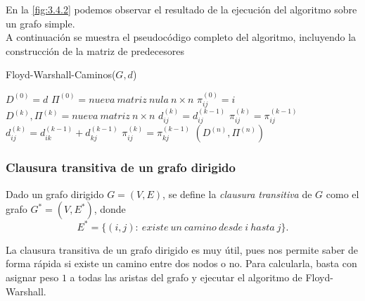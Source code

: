 En la \autoref{fig:3.4.2} podemos observar el resultado de la ejecución del algoritmo sobre un grafo simple. \\

A continuación se muestra el pseudocódigo completo del algoritmo, incluyendo la construcción de la matriz de predecesores

\begin{breakablealgorithm}
	\caption{Floyd-Warshall-Caminos($G,d$)}
	\begin{algorithmic}[1]
		\State $D^{(0)}=d$
		\State $\Pi^{(0)}=nueva\ matriz\ nula\ n\times n$
			\State $\pi_{ij}^{(0)}=i$
		\EndFor
			\State $D^{(k)},\Pi^{(k)}=nueva\ matriz\ n\times n$
						\State $d_{ij}^{(k)}=d_{ij}^{(k-1)}$
						\State $\pi_{ij}^{(k)}=\pi_{ij}^{(k-1)}$
					\Else
						\State $d_{ij}^{(k)}=d_{ik}^{(k-1)}+d_{kj}^{(k-1)}$
						\State $\pi_{ij}^{(k)}=\pi_{kj}^{(k-1)}$
					\EndIf
				\EndFor
			\EndFor
		\EndFor
		\Return $(D^{(n)},\Pi^{(n)})$
	\end{algorithmic}
\end{breakablealgorithm}

\subsubsection{Clausura transitiva de un grafo dirigido}

\begin{definicion}
	Dado un grafo dirigido $G=(V,E)$, se define la \textit{clausura transitiva} de $G$ como el grafo $G^*=(V,E^*)$, donde
	$$E^*=\{(i,j):\ existe\ un\ camino\ desde\ i\ hasta\ j\}.$$
\end{definicion}

La clausura transitiva de un grafo dirigido es muy útil, pues nos permite saber de forma rápida si existe un camino entre dos nodos o no. Para calcularla, basta con asignar peso $1$ a todas las aristas del grafo y ejecutar el algoritmo de Floyd-Warshall. \\

